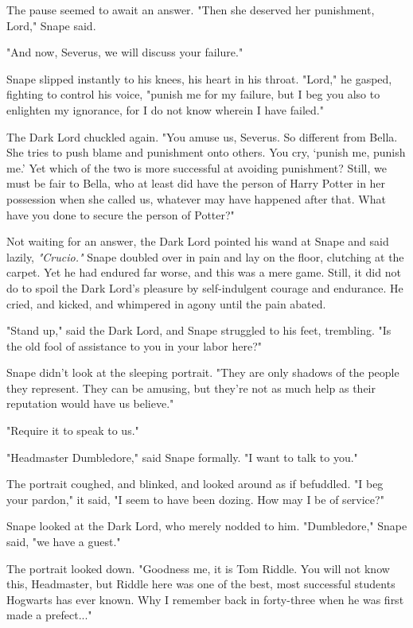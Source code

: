 The pause seemed to await an answer. "Then she deserved her punishment, Lord," Snape said.

"And now, Severus, we will discuss your failure."

Snape slipped instantly to his knees, his heart in his throat. "Lord," he gasped, fighting to control his voice, "punish me for my failure, but I beg you also to enlighten my ignorance, for I do not know wherein I have failed."

The Dark Lord chuckled again. "You amuse us, Severus. So different from Bella. She tries to push blame and punishment onto others. You cry, `punish me, punish me.' Yet which of the two is more successful at avoiding punishment? Still, we must be fair to Bella, who at least did have the person of Harry Potter in her possession when she called us, whatever may have happened after that. What have you done to secure the person of Potter?"

Not waiting for an answer, the Dark Lord pointed his wand at Snape and said lazily, \emph{"Crucio."} Snape doubled over in pain and lay on the floor, clutching at the carpet. Yet he had endured far worse, and this was a mere game. Still, it did not do to spoil the Dark Lord's pleasure by self-indulgent courage and endurance. He cried, and kicked, and whimpered in agony until the pain abated.

"Stand up," said the Dark Lord, and Snape struggled to his feet, trembling. "Is the old fool of assistance to you in your labor here?"

Snape didn't look at the sleeping portrait. "They are only shadows of the people they represent. They can be amusing, but they're not as much help as their reputation would have us believe."

"Require it to speak to us."

"Headmaster Dumbledore," said Snape formally. "I want to talk to you."

The portrait coughed, and blinked, and looked around as if befuddled. "I beg your pardon," it said, "I seem to have been dozing. How may I be of service?"

Snape looked at the Dark Lord, who merely nodded to him. "Dumbledore," Snape said, "we have a guest."

The portrait looked down. "Goodness me, it is Tom Riddle. You will not know this, Headmaster, but Riddle here was one of the best, most successful students Hogwarts has ever known. Why I remember back in forty-three when he was first made a prefect..."

